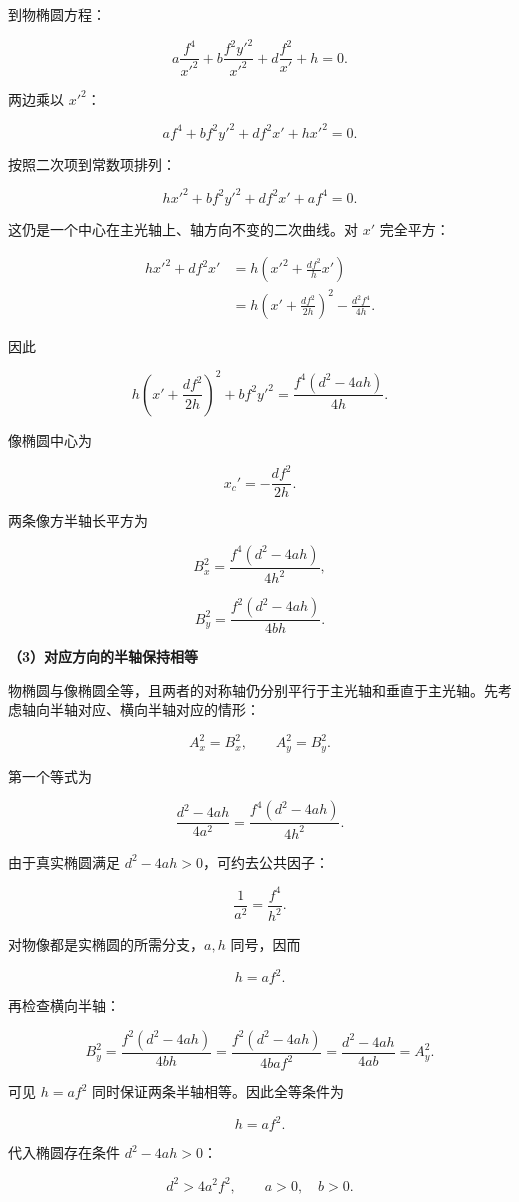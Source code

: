 \documentclass[12pt,a4paper,UTF8]{ctexart}
\begin{document}
到物椭圆方程：

\[a\frac{f^4}{x'^2}
+b\frac{f^2y'^2}{x'^2}
+d\frac{f^2}{x'}+h=0.\]

两边乘以 \(x'^2\)：

\[af^4+bf^2y'^2+df^2x'+hx'^2=0.\]

按照二次项到常数项排列：

\[hx'^2+bf^2y'^2+df^2x'+af^4=0.\]

这仍是一个中心在主光轴上、轴方向不变的二次曲线。对 \(x'\) 完全平方：

\[\begin{aligned}
hx'^2+df^2x'
&=h\left(x'^2+\frac{df^2}{h}x'\right)\\
&=h\left(x'+\frac{df^2}{2h}\right)^2
-\frac{d^2f^4}{4h}.
\end{aligned}\]

因此

\[h\left(x'+\frac{df^2}{2h}\right)^2+bf^2y'^2
=\frac{f^4(d^2-4ah)}{4h}.\]

像椭圆中心为

\[x_c'=-\frac{df^2}{2h}.\]

两条像方半轴长平方为

\[B_x^2=\frac{f^4(d^2-4ah)}{4h^2},\]

\[B_y^2=\frac{f^2(d^2-4ah)}{4bh}.\]

\textbf{（3）对应方向的半轴保持相等}

物椭圆与像椭圆全等，且两者的对称轴仍分别平行于主光轴和垂直于主光轴。先考虑轴向半轴对应、横向半轴对应的情形：

\[A_x^2=B_x^2,\qquad A_y^2=B_y^2.\]

第一个等式为

\[\frac{d^2-4ah}{4a^2}
=\frac{f^4(d^2-4ah)}{4h^2}.\]

由于真实椭圆满足 \(d^2-4ah>0\)，可约去公共因子：

\[\frac1{a^2}=\frac{f^4}{h^2}.\]

对物像都是实椭圆的所需分支，\(a,h\) 同号，因而

\[h=af^2.\]

再检查横向半轴：

\[B_y^2
=\frac{f^2(d^2-4ah)}{4bh}
=\frac{f^2(d^2-4ah)}{4baf^2}
=\frac{d^2-4ah}{4ab}
=A_y^2.\]

可见 \(h=af^2\) 同时保证两条半轴相等。因此全等条件为

\[\boxed{h=af^2}.\]

代入椭圆存在条件 \(d^2-4ah>0\)：

\[\boxed{d^2>4a^2f^2},\qquad a>0,\quad b>0.\]
\end{document}
